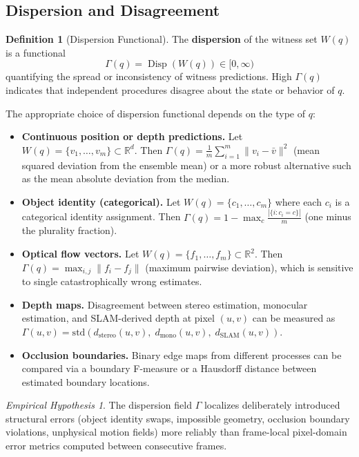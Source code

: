 \documentclass[11pt,a4paper]{article}
\theoremstyle{plain}
\theoremstyle{definition}
\newtheorem{definition}[theorem]{Definition}
\theoremstyle{remark}
\newtheorem{hypothesis}[theorem]{Empirical Hypothesis}
\DeclareMathOperator{\Disp}{Disp}
\begin{document}
\subsection{Dispersion and Disagreement}

\begin{definition}[Dispersion Functional]
The \textbf{dispersion} of the witness set $W(q)$ is a functional
\[
\Gamma(q) = \Disp(W(q)) \in [0, \infty)
\]
quantifying the spread or inconsistency of witness predictions. High $\Gamma(q)$ indicates that independent procedures disagree about the state or behavior of $q$.
\end{definition}

The appropriate choice of dispersion functional depends on the type of $q$:

\begin{itemize}[leftmargin=2em,itemsep=2pt]
\item \textbf{Continuous position or depth predictions.} Let $W(q) = \{v_1, \ldots, v_m\} \subset \mathbb{R}^d$. Then $\Gamma(q) = \frac{1}{m}\sum_{i=1}^m \|v_i - \bar{v}\|^2$ (mean squared deviation from the ensemble mean) or a more robust alternative such as the mean absolute deviation from the median.

\item \textbf{Object identity (categorical).} Let $W(q) = \{c_1, \ldots, c_m\}$ where each $c_i$ is a categorical identity assignment. Then $\Gamma(q) = 1 - \max_c \frac{|\{i : c_i = c\}|}{m}$ (one minus the plurality fraction).

\item \textbf{Optical flow vectors.} Let $W(q) = \{f_1, \ldots, f_m\} \subset \mathbb{R}^2$. Then $\Gamma(q) = \max_{i,j} \|f_i - f_j\|$ (maximum pairwise deviation), which is sensitive to single catastrophically wrong estimates.

\item \textbf{Depth maps.} Disagreement between stereo estimation, monocular estimation, and SLAM-derived depth at pixel $(u,v)$ can be measured as $\Gamma(u,v) = \mathrm{std}(d_{\text{stereo}}(u,v),\; d_{\text{mono}}(u,v),\; d_{\text{SLAM}}(u,v))$.

\item \textbf{Occlusion boundaries.} Binary edge maps from different processes can be compared via a boundary F-measure or a Hausdorff distance between estimated boundary locations.
\end{itemize}

\begin{hypothesis}
\label{hyp:gamma}
The dispersion field $\Gamma$ localizes deliberately introduced structural errors (object identity swaps, impossible geometry, occlusion boundary violations, unphysical motion fields) more reliably than frame-local pixel-domain error metrics computed between consecutive frames.
\end{hypothesis}
\end{document}

